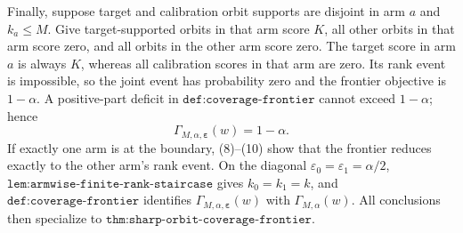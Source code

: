Finally, suppose target and calibration orbit supports are disjoint in arm \(a\) and \(k_a\le M\). Give target-supported orbits in that arm score \(K\), all other orbits in that arm score zero, and all orbits in the other arm score zero. The target score in arm \(a\) is always \(K\), whereas all calibration scores in that arm are zero. Its rank event is impossible, so the joint event has probability zero and the frontier objective is \(1-\alpha\). A positive-part deficit in \(\texttt{def:coverage-frontier}\) cannot exceed \(1-\alpha\); hence
\[
\Gamma_{M,\alpha,\boldsymbol\varepsilon}(w)=1-\alpha.
\]
If exactly one arm is at the boundary, (8)--(10) show that the frontier reduces exactly to the other arm's rank event. On the diagonal \(\varepsilon_0=\varepsilon_1=\alpha/2\), \(\texttt{lem:armwise-finite-rank-staircase}\) gives \(k_0=k_1=k\), and \(\texttt{def:coverage-frontier}\) identifies \(\Gamma_{M,\alpha,\boldsymbol\varepsilon}(w)\) with \(\Gamma_{M,\alpha}(w)\). All conclusions then specialize to \(\texttt{thm:sharp-orbit-coverage-frontier}\).